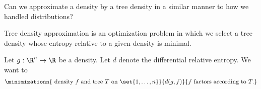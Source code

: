 

Can we approximate a density by a tree density in a similar manner to how we handled distributions?


Tree density approximation is an optimization problem in which we select a tree density whose entropy relative to a given density is minimal.


Let $g: \R^n \to \R$ be a density.
Let $d$ denote the differential
relative entropy.
We want to
\[
  \minimizationn{
    \text{ density } f \text{ and tree } T \text{ on } \set{1, \dots, n}
  }{
    d(g, f)
  }{
    f \text{ factors according to } T.
  }
\]
